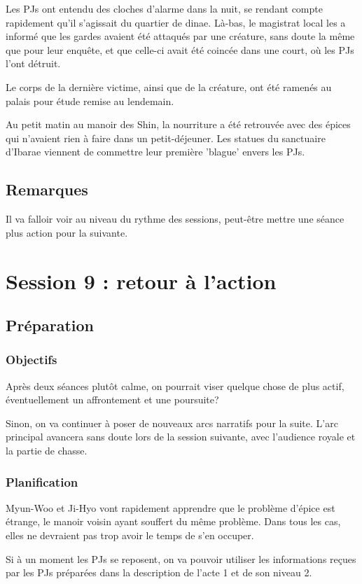 \documentclass[10pt,a4paper]{book}
\begin{document}
Les PJs ont entendu des cloches d'alarme dans la nuit, se rendant compte rapidement qu'il s'agissait du quartier de dinae. Là-bas, le magistrat local les a informé que les gardes avaient été attaqués par une créature, sans doute la même que pour leur enquête, et que celle-ci avait été coincée dans une court, où les PJs l'ont détruit.

Le corps de la dernière victime, ainsi que de la créature, ont été ramenés au palais pour étude remise au lendemain.

Au petit matin au manoir des Shin, la nourriture a été retrouvée avec des épices qui n'avaient rien à faire dans un petit-déjeuner. Les statues du sanctuaire d'Ibarae viennent de commettre leur première 'blague' envers les PJs.
\subsection{Remarques}
Il va falloir voir au niveau du rythme des sessions, peut-être mettre une séance plus action pour la suivante.
\section{Session 9 : retour à l'action}
\subsection{Préparation}
\subsubsection{Objectifs}
Après deux séances plutôt calme, on pourrait viser quelque chose de plus actif, éventuellement un affrontement et une poursuite?

Sinon, on va continuer à poser de nouveaux arcs narratifs pour la suite. L'arc principal avancera sans doute lors de la session suivante, avec l'audience royale et la partie de chasse.
\subsubsection{Planification}
Myun-Woo et Ji-Hyo vont rapidement apprendre que le problème d'épice est étrange, le manoir voisin ayant souffert du même problème. Dans tous les cas, elles ne devraient pas trop avoir le temps de s'en occuper.

Si à un moment les PJs se reposent, on va pouvoir utiliser les informations reçues par les PJs préparées dans la description de l'acte 1 et de son niveau 2.
\end{document}
